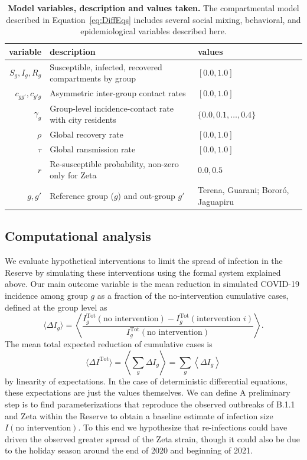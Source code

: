 \documentclass[
  letterpaper,
  abstract]{scrartcl}
\begin{document}
\begin{table}[h]
  \centering
  \caption{\textbf{Model variables, description and values taken.} The
  compartmental model described in Equation~\ref{eq:DiffEqs} includes several
social mixing, behavioral, and epidemiological variables described here.}
  \label{tab:ModelVariables}
  \begin{tabular}{rlp{1.3in}} 
    \toprule
    variable & description & values \\ 
    \midrule 
    $S_g,I_g,R_g$ & Susceptible, infected, recovered compartments by group & $[0.0,1.0]$ \\
    $c_{gg'},c_{g'g}$ & Asymmetric inter-group contact rates & $[0.0,1.0]$ \\
    $\gamma_g$ & Group-level incidence-contact rate with city residents &
      $\{0.0,0.1,\ldots,0.4\}$ \\
    $\rho$ & Global recovery rate & $[0.0,1.0]$ \\
    $\tau$ & Global ransmission rate & $[0.0,1.0]$ \\
    $r$    & Re-susceptible probability, non-zero only for Zeta & $0.0,0.5$ \\
    $g,g'$ & Reference group ($g$) and out-group $g'$ & Terena, Guarani; Bororó, Jaguapiru \\
    \bottomrule
  \end{tabular} 
\end{table}


\subsection{Computational analysis}

We evaluate hypothetical interventions to limit the spread of
infection in the Reserve by simulating these interventions using the formal
system explained above. Our main outcome variable is the mean reduction 
in simulated COVID-19 incidence among group $g$ as a fraction of the no-intervention
cumulative cases, defined at the group level as
\begin{equation}
  \langle \Delta I_g \rangle = \left\langle \frac{I^\mathrm{Tot}_g(\text{no intervention}) -
    I^\mathrm{Tot}_g(\text{intervention } i)}{I^\mathrm{Tot}_g(\text{no
  intervention})} \right\rangle.
  \label{eq:DeltaI_byGroup}
\end{equation}
\noindent
The mean total expected reduction of cumulative cases is 
\begin{equation}
  \langle \Delta I^\mathrm{Tot} \rangle = \left \langle \sum_g \Delta I_g \right \rangle = \sum_g \left \langle \Delta I_g \right \rangle 
  \label{eq:DeltaI}
\end{equation}
\noindent
by linearity of expectations.
In the case of deterministic differential equations, these expectations are just the
values themselves.  We can define A preliminary step is to find parameterizations
that reproduce the observed outbreaks of B.1.1 and Zeta within the Reserve to obtain
a baseline estimate of infection size $I(\text{no intervention})$.  To this end we
hypothesize that re-infections could have driven the observed greater spread of the
Zeta strain, though it could also be due to the holiday season around the end of
2020 and beginning of 2021. 
\end{document}
